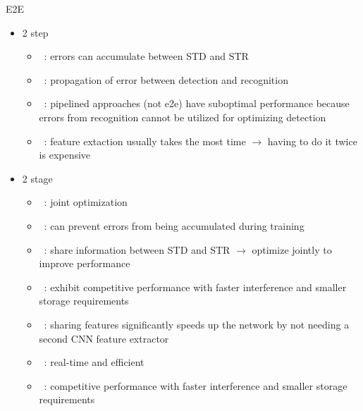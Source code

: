 E2E
\begin{itemize}
    \item 2 step
        \begin{itemize}
            \item~\cite{chen_text_2021}: errors can accumulate between STD and STR
            \item~\cite{long_scene_2021}: propagation of error between detection and recognition
            \item~\cite{qiao_text_2021}: pipelined approaches (not e2e) have suboptimal performance
                because errors from recognition cannot be utilized for optimizing detection
            \item~\cite{liu_fots_2018}: feature extaction usually takes the most time
                $\rightarrow$ having to do it twice is expensive
        \end{itemize}
    \item 2 stage
        \begin{itemize}
            \item~\cite{chen_text_2021}: joint optimization
            \item~\cite{chen_text_2021}: can prevent errors from being accumulated during training
            \item~\cite{chen_text_2021}: share information between STD and STR
                $\rightarrow$ optimize jointly to improve performance
            \item~\cite{chen_text_2021}: exhibit competitive performance with faster interference
                and smaller storage requirements
            \item~\cite{liu_fots_2018}: sharing features significantly speeds up the network
                by not needing a second \ac{CNN} feature extractor
            \item~\cite{chen_text_2021}: real-time and efficient
            \item~\cite{chen_text_2021}: competitive performance with faster interference and
                smaller storage requirements
        \end{itemize}
\end{itemize}

